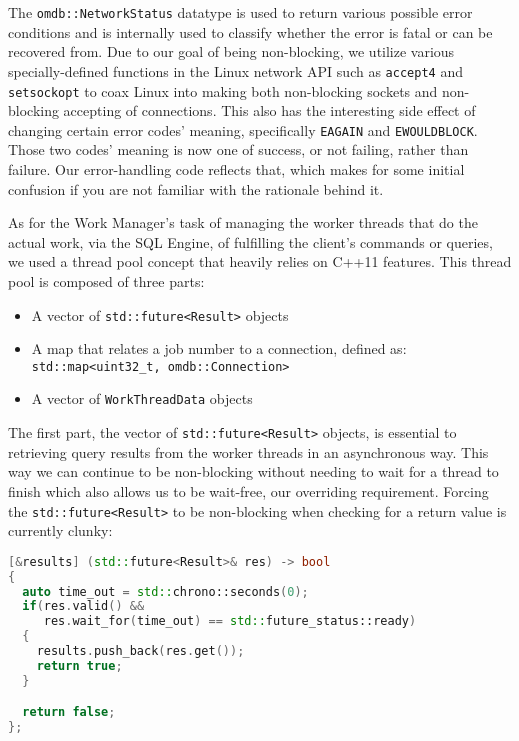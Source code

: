 \documentclass[letterpaper, 12pt]{article}
\begin{document}
  The \lstinline[basicstyle=\ttfamily]|omdb::NetworkStatus| datatype is used to return various 
  possible error conditions and is internally used to classify whether the error is fatal 
  or can be recovered from. Due to our goal of being non-blocking, we utilize various specially-defined
  functions in the Linux network API such as \lstinline[basicstyle=\ttfamily]|accept4| and 
  \lstinline[basicstyle=\ttfamily]|setsockopt| to coax Linux into making both non-blocking
  sockets and non-blocking accepting of connections. This also has the interesting side effect of
  changing certain error codes' meaning, specifically \lstinline[basicstyle=\ttfamily]|EAGAIN| and 
  \lstinline[basicstyle=\ttfamily]|EWOULDBLOCK|. Those two codes' meaning is now one of success, or not 
  failing, rather than failure. Our error-handling code reflects that, which makes for some initial 
  confusion if you are not familiar with the rationale behind it.
  \par\vspace{\baselineskip}
  As for the Work Manager's task of managing the worker threads that do the actual work, via the 
  SQL Engine, of fulfilling the client's commands or queries, we used a thread pool concept that
  heavily relies on C++11 features. This thread pool is composed of three parts:
  \begin{itemize}
   \item A vector of \lstinline[]|std::future<Result>| objects
   \item A map that relates a job number to a connection, defined as:\\
	 \lstinline[]|std::map<uint32_t, omdb::Connection>|
   \item A vector of \lstinline[]|WorkThreadData| objects
  \end{itemize}
  The first part, the vector of \lstinline[basicstyle=\ttfamily]|std::future<Result>| objects, is 
  essential to retrieving query results from the worker threads in an asynchronous way. This way
  we can continue to be non-blocking without needing to wait for a thread to finish which also
  allows us to be wait-free, our overriding requirement. Forcing the \lstinline[basicstyle=\ttfamily]|std::future<Result>|
  to be non-blocking when checking for a return value is currently clunky:
  \begin{lstlisting}[language=C++]
[&results] (std::future<Result>& res) -> bool
{
  auto time_out = std::chrono::seconds(0);
  if(res.valid() &&
     res.wait_for(time_out) == std::future_status::ready)
  {
    results.push_back(res.get());
    return true;
  }

  return false;
};
  \end{lstlisting}
\end{document}
